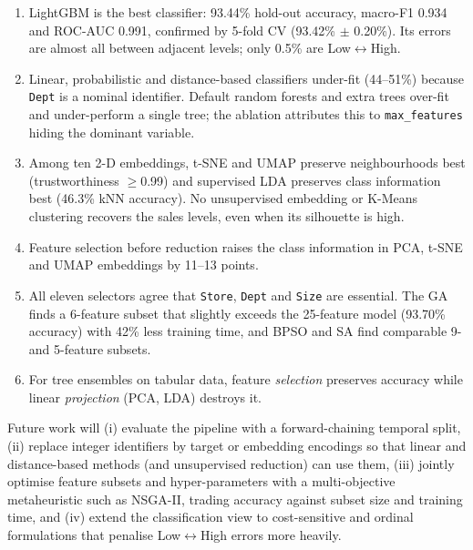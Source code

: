 \begin{enumerate}
\item LightGBM is the best classifier: 93.44\% hold-out accuracy, macro-F1 0.934 and ROC-AUC 0.991, confirmed by 5-fold CV (93.42\% $\pm$ 0.20\%). Its errors are almost all between adjacent levels; only 0.5\% are Low$\leftrightarrow$High.
\item Linear, probabilistic and distance-based classifiers under-fit (44--51\%) because \texttt{Dept} is a nominal identifier. Default random forests and extra trees over-fit and under-perform a single tree; the ablation attributes this to \texttt{max\_features} hiding the dominant variable.
\item Among ten 2-D embeddings, t-SNE and UMAP preserve neighbourhoods best (trustworthiness $\ge$0.99) and supervised LDA preserves class information best (46.3\% kNN accuracy). No unsupervised embedding or K-Means clustering recovers the sales levels, even when its silhouette is high.
\item Feature selection before reduction raises the class information in PCA, t-SNE and UMAP embeddings by 11--13 points.
\item All eleven selectors agree that \texttt{Store}, \texttt{Dept} and \texttt{Size} are essential. The GA finds a 6-feature subset that slightly exceeds the 25-feature model (93.70\% accuracy) with 42\% less training time, and BPSO and SA find comparable 9- and 5-feature subsets.
\item For tree ensembles on tabular data, feature \emph{selection} preserves accuracy while linear \emph{projection} (PCA, LDA) destroys it.
\end{enumerate}

Future work will (i) evaluate the pipeline with a forward-chaining temporal split, (ii) replace integer identifiers by target or embedding encodings so that linear and distance-based methods (and unsupervised reduction) can use them, (iii) jointly optimise feature subsets and hyper-parameters with a multi-objective metaheuristic such as NSGA-II, trading accuracy against subset size and training time, and (iv) extend the classification view to cost-sensitive and ordinal formulations that penalise Low$\leftrightarrow$High errors more heavily.
